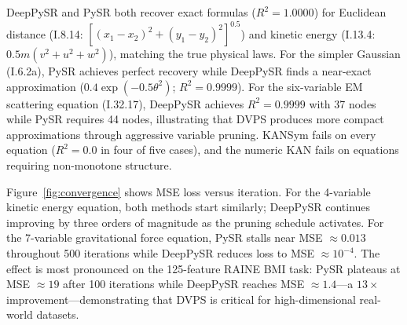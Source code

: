 \documentclass[10pt,twocolumn]{article}
\begin{document}
\begin{table}[t]
\centering
\caption{Results on Feynman physics equations.  Complexity: node count of
  best formula.  ``1.0000'': exact recovery ($R^2 \geq 1-10^{-10}$).}
\label{tab:feynman_results}
\end{table}

DeepPySR and PySR both recover exact formulas ($R^2 = 1.0000$) for Euclidean
distance (I.8.14: $[(x_1-x_2)^2+(y_1-y_2)^2]^{0.5}$) and kinetic energy
(I.13.4: $0.5m(v^2+u^2+w^2)$), matching the true physical laws.  For the
simpler Gaussian (I.6.2a), PySR achieves perfect recovery while DeepPySR
finds a near-exact approximation ($0.4\exp(-0.5\theta^2)$; $R^2 = 0.9999$).
For the six-variable EM scattering equation (I.32.17), DeepPySR achieves
$R^2 = 0.9999$ with 37 nodes while PySR requires 44 nodes, illustrating that
DVPS produces more compact approximations through aggressive variable pruning.
KANSym fails on every equation ($R^2 = 0.0$ in four of five cases), and the
numeric KAN fails on equations requiring non-monotone structure.

Figure~\ref{fig:convergence} shows MSE loss versus iteration.  For the
4-variable kinetic energy equation, both methods start similarly; DeepPySR
continues improving by three orders of magnitude as the pruning schedule
activates.  For the 7-variable gravitational force equation, PySR stalls near
MSE $\approx 0.013$ throughout 500 iterations while DeepPySR reduces loss to
MSE $\approx 10^{-4}$.  The effect is most pronounced on the 125-feature RAINE
BMI task: PySR plateaus at MSE $\approx 19$ after 100 iterations while
DeepPySR reaches MSE $\approx 1.4$—a $13\times$ improvement—demonstrating that
DVPS is critical for high-dimensional real-world datasets.
\end{document}
